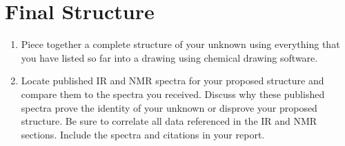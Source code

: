 \documentclass[titlepage]{article}
\begin{document}
\begin{enumerate}
\begin{center}
    \end{center}
\end{enumerate}



\section*{Final Structure}
\begin{enumerate}
    \item Piece together a complete structure of your unknown using everything that you have listed so far into a drawing using chemical drawing software.
    \item Locate published IR and  NMR spectra for your proposed structure and compare them to the spectra you received. Discuss why these published spectra prove the identity of your unknown or disprove your proposed structure. Be sure to correlate all data referenced in the IR and  NMR sections. Include the spectra and citations in your report.
\end{enumerate}
\end{document}
